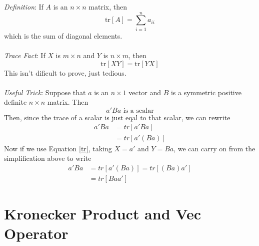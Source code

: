 \documentclass[a4paper,12pt]{scrartcl}
\begin{document}
{\sl Definition}: If $A$ is an $n\times n$ matrix, then 
\begin{equation}
    \text{tr}[A] = \sum^n_{i=1} a_{ii} 
\end{equation}
which is the sum of diagonal elements.
\\
\\
{\sl Trace Fact}: If $X$ is $m\times n$ and $Y$
is $n\times m$, then
\begin{equation}
    \label{tr}
    \text{tr}[XY] = \text{tr}[YX]
\end{equation}
This isn't dificult to prove, just tedious. 
\\
\\
{\sl Useful Trick}: Suppose that $a$ is an 
$n\times 1$ vector and $B$ is a symmetric
positive definite $n\times n$ matrix. Then 
    \[ a' B a \text{ is a scalar} \]
Then, since the trace of a scalar is just eqal
to that scalar, we can rewrite
\begin{align*}
    a' B a &= tr\left[a' B a \right] \\
    &= tr\left[a' (B a) \right] 
\end{align*}
Now if we use Equation \ref{tr}, taking $X = a'$ and
$Y = Ba$, we can carry on from the simplification
above to write
\begin{align*}
    a' B a &= tr\left[a' (B a) \right]  
	= tr\left[(B a) a' \right]  \\
	&= tr\left[B a a' \right]
\end{align*}


\newpage
\section{Kronecker Product and Vec Operator}
\end{document}
